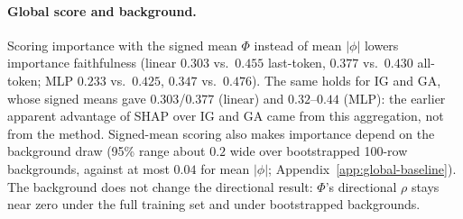 \paragraph{Global score and background.} Scoring importance with the signed mean $\Phi$ instead of mean $|\phi|$ lowers importance faithfulness (linear $0.303$ vs.\ $0.455$ last-token, $0.377$ vs.\ $0.430$ all-token; MLP $0.233$ vs.\ $0.425$, $0.347$ vs.\ $0.476$). The same holds for IG and GA, whose signed means gave $0.303$/$0.377$ (linear) and $0.32$--$0.44$ (MLP): the earlier apparent advantage of SHAP over IG and GA came from this aggregation, not from the method. Signed-mean scoring also makes importance depend on the background draw (95\% range about $0.2$ wide over bootstrapped 100-row backgrounds, against at most $0.04$ for mean $|\phi|$; Appendix~\ref{app:global-baseline}). The background does not change the directional result: $\Phi$'s directional $\rho$ stays near zero under the full training set and under bootstrapped backgrounds.



